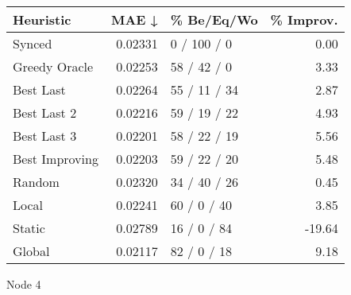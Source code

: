 \begin{tabular}{lrlr}
\toprule
\textbf{Heuristic} & \textbf{MAE ↓} & \textbf{\% Be/Eq/Wo} & \textbf{\% Improv.} \\
\midrule
            Synced &        0.02331 &          0 / 100 / 0 &                0.00 \\
     Greedy Oracle &        0.02253 &          58 / 42 / 0 &                3.33 \\
         Best Last &        0.02264 &         55 / 11 / 34 &                2.87 \\
       Best Last 2 &        0.02216 &         59 / 19 / 22 &                4.93 \\
       Best Last 3 &        0.02201 &         58 / 22 / 19 &                5.56 \\
    Best Improving &        0.02203 &         59 / 22 / 20 &                5.48 \\
            Random &        0.02320 &         34 / 40 / 26 &                0.45 \\
             Local &        0.02241 &          60 / 0 / 40 &                3.85 \\
            Static &        0.02789 &          16 / 0 / 84 &              -19.64 \\
            Global &        0.02117 &          82 / 0 / 18 &                9.18 \\
\bottomrule
\end{tabular}
\caption{Node 4}
\label{tab:iid_lr01_le1_bs4_4}
